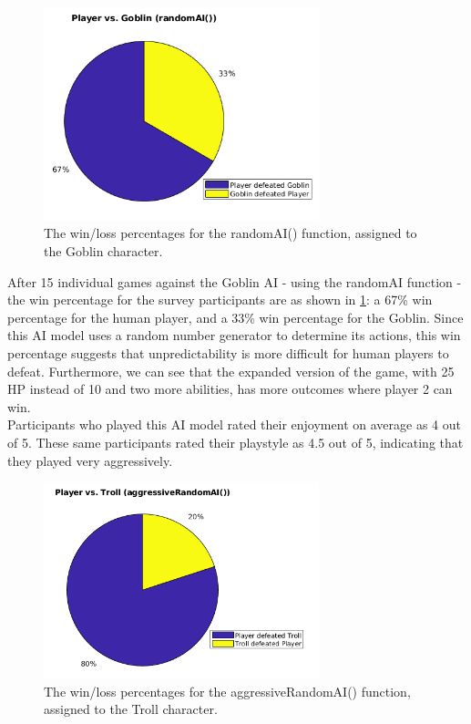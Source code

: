 \begin{figure}[H]
  \centering
  \includegraphics[width=8cm]{figures/goblinWins.png}
  \caption{The win/loss percentages for the randomAI() function, assigned to the Goblin character.}
  \label{fig:pieGoblin}
\end{figure}
After 15 individual games against the Goblin AI - using the randomAI function - the win percentage for the survey participants are as shown in \ref{fig:pieGoblin}: a 67\% win percentage for the human player, and a 33\% win percentage for the Goblin. Since this AI model uses a random number generator to determine its actions, this win percentage suggests that unpredictability is more difficult for human players to defeat. Furthermore, we can see that the expanded version of the game, with 25 HP instead of 10 and two more abilities, has more outcomes where player 2 can win.\\

Participants who played this AI model rated their enjoyment on average as 4 out of 5. These same participants rated their playstyle as 4.5 out of 5, indicating that they played very aggressively.

\begin{figure}[H]
  \centering
  \includegraphics[width=8cm]{figures/trollWins.png}
  \caption{The win/loss percentages for the aggressiveRandomAI() function, assigned to the Troll character.}
  \label{fig:pieTroll}
\end{figure}

